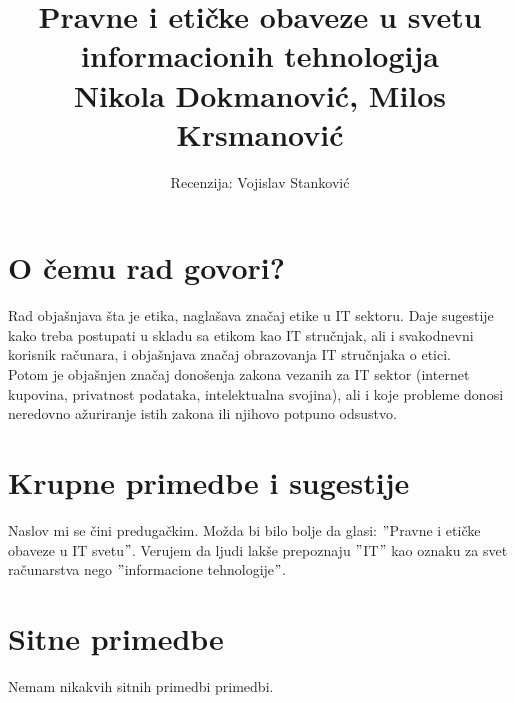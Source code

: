 \documentclass[a4paper]{article}
\begin{document}
\title{Pravne i etičke obaveze u svetu
informacionih tehnologija\\ \small{Nikola Dokmanović, Milos Krsmanović}}

\author{Recenzija: Vojislav Stanković}


\maketitle




\section{O čemu rad govori?}
Rad objašnjava šta je etika, naglašava značaj etike u IT sektoru. Daje sugestije kako treba postupati u skladu sa etikom kao IT stručnjak, ali i svakodnevni korisnik računara, i objašnjava značaj obrazovanja IT stručnjaka o etici.\\
Potom je objašnjen značaj donošenja zakona vezanih za IT sektor (internet kupovina, privatnost podataka, intelektualna svojina), ali i koje probleme donosi neredovno ažuriranje istih zakona ili njihovo potpuno odsustvo.

\section{Krupne primedbe i sugestije}
Naslov mi se čini predugačkim. Možda bi bilo bolje da glasi: $"$Pravne i etičke obaveze u IT svetu$"$. Verujem da ljudi lakše prepoznaju $"$IT$"$ kao oznaku za svet računarstva nego $"$informacione tehnologije$"$.

\section{Sitne primedbe}
Nemam nikakvih sitnih primedbi primedbi.
\end{document}
